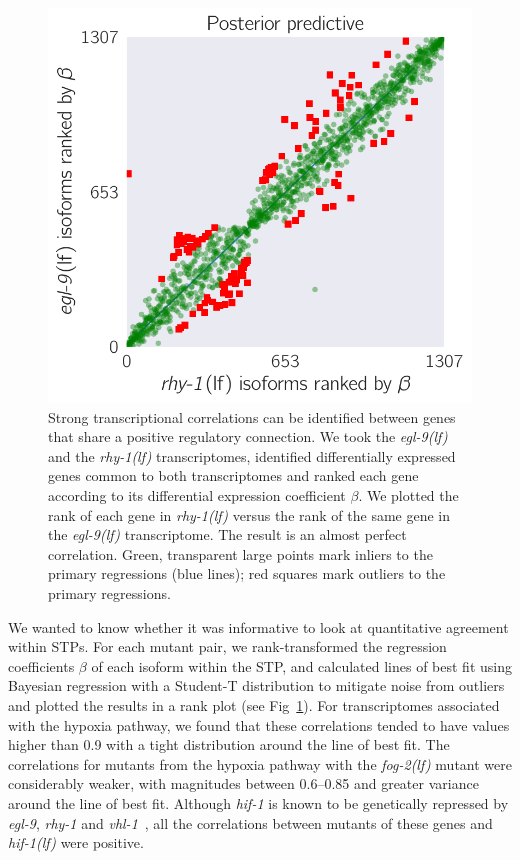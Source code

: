 \documentclass[10pt, onecolumn]{article}
\newcommand{\gene}[1]{\emph{#1}}
\newcommand{\fog}{\emph{\mbox{fog-2(lf)}}}
\newcommand{\egl}{\emph{\mbox{egl-9}(lf)}}
\newcommand{\rhy}{\emph{\mbox{rhy-1}(lf)}}
\newcommand{\hif}{\emph{\mbox{hif-1(lf)}}}
\begin{document}
\begin{figure}[tbhp]
\centering
\includegraphics[width=.4\linewidth]{../figs/multiplemodes-eb.pdf}
\caption{
Strong transcriptional correlations can be identified between genes
that share a positive regulatory connection. We took the \egl{} and the \rhy{}
transcriptomes, identified differentially expressed genes common to both
transcriptomes and ranked each gene according to its differential expression
coefficient $\beta$. We plotted the rank of each gene in \rhy{} versus the
rank of the same gene in the \egl{} transcriptome. The result is an almost
perfect correlation. Green, transparent large points mark inliers to the primary
regressions (blue lines); red squares mark outliers to the primary regressions.
}
\label{fig:genetic_interactions}
\end{figure}

We wanted to know whether it was informative to look at quantitative agreement
within STPs. For each mutant pair, we rank-transformed
the regression coefficients $\beta$ of each isoform within the STP, and
calculated lines of best fit using Bayesian regression with a Student-T
distribution to mitigate noise from outliers and plotted the results in a rank plot
(see Fig~\ref{fig:genetic_interactions}). For transcriptomes associated with the
hypoxia pathway, we found that these correlations tended to have
values higher than 0.9 with a tight distribution around the line of best fit.
The correlations for mutants from the hypoxia pathway
with the \fog{} mutant were considerably weaker, with magnitudes between
0.6--0.85 and greater variance around the line of best fit.
Although \gene{hif-1} is known to be genetically repressed by \gene{egl-9}, \gene{rhy-1} and
\gene{vhl-1}~\cite{Epstein2001,Shen2006}, all the correlations
between mutants of these genes and \hif{} were positive.
\end{document}
